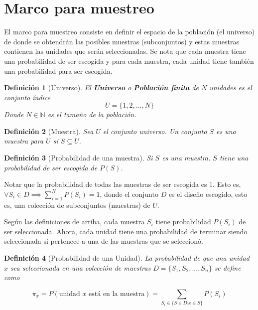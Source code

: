 \documentclass{report}
\newtheorem{definition}{Definición}
\begin{document}
\section{Marco para muestreo}

El marco para muestreo \cite{lohr-2009} consiste en definir el espacio de la población (el universo) de donde se obtendrán las posibles muestras (subconjuntos) y estas muestras contienen las unidades que serán seleccionadas. Se nota que cada muestra tiene una probabilidad de ser escogida y para cada muestra, cada unidad tiene también una probabilidad para ser escogida.

\begin{definition}[Universo]
    El \textbf{Universo} o \textbf{Población finita} de $N$ unidades es el conjunto índice
    $$
    U = \{ 1, 2, ..., N \}
    $$
    Donde $N \in \mathbb{N}$ es el tamaño de la población.
\end{definition}

\bigbreak

\begin{definition}[Muestra]
    Sea $U$ el conjunto universo. Un conjunto $S$ es una muestra para $U$ si $S \subseteq U$.
\end{definition}

\bigbreak

\begin{definition}[Probabilidad de una muestra]
    Si $S$ es una muestra. $S$ tiene una probabilidad de ser escogida de $P(S)$.
\end{definition}

\bigbreak

Notar que la probabilidad de todas las muestras de ser escogida es $1$. Esto es, $\forall S_i \in D \implies \sum_{i=1}^{N} P(S_i) = 1$, donde el conjunto $D$ es el diseño escogido, esto es, una colección de subconjuntos (muestras) de $U$.

\bigbreak

Según las definiciones de arriba, cada muestra $S_i$ tiene probabilidad $P(S_i)$ de ser seleccionada. Ahora, cada unidad tiene una probabilidad de terminar siendo seleccionada si pertenece a una de las muestras que se seleccionó.

\begin{definition}[Probabilidad de una Unidad]
    La probabilidad de que una unidad $x$ sea seleccionada en una colección de muestras $D = \{ S_1, S_2, ..., S_n \}$ se define como
    
    $$
    \pi_x = P(\text{unidad $x$ está en la muestra}) = \sum_{S_i \in \{ S \in D | x \in S \}} P(S_i)
    $$
\end{definition}
\end{document}
